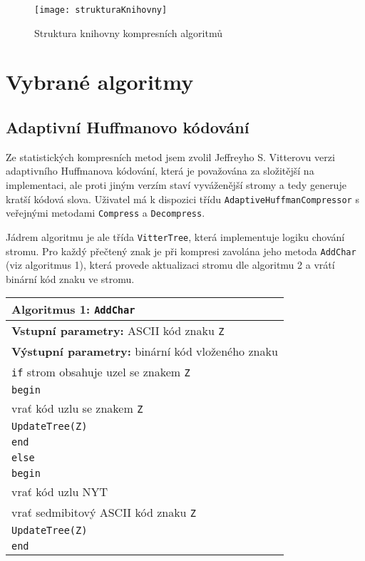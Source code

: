 \begin{figure}[!h]
\centering
\texttt{[image: strukturaKnihovny]}
\caption{Struktura knihovny kompresních algoritmů}
\label{strukturaKnihovny}
\end{figure}


\section{Vybrané algoritmy}
\subsection{Adaptivní Huffmanovo kódování}
Ze statistických kompresních metod jsem zvolil Jeffreyho S. Vitterovu verzi adaptivního Huffmanova kódování, která je považována za složitější na implementaci, ale proti jiným verzím staví vyváženější stromy a tedy generuje kratší kódová slova. Uživatel má k dispozici třídu \texttt{AdaptiveHuffmanCompressor} s veřejnými metodami \texttt{Compress} a \texttt{Decompress}. 

Jádrem algoritmu je ale třída \texttt{VitterTree}, která implementuje logiku chování stromu. Pro každý přečtený znak je při kompresi zavolána jeho metoda \texttt{AddChar} (viz algoritmus 1), která provede aktualizaci stromu dle algoritmu 2 a vrátí binární kód znaku ve stromu.

\begin{table}[!h]
\centering
\begin{tabular}{l}
\hline
\textbf{Algoritmus 1:} \texttt{AddChar}\\
\hline
\textbf{Vstupní parametry:} ASCII kód znaku \texttt{Z}\\
\textbf{Výstupní parametry:} binární kód vloženého znaku\\
\hline
\texttt{if} strom obsahuje uzel se znakem \texttt{Z}\\
\texttt{begin}\\
\hspace*{5mm}vrať kód uzlu se znakem \texttt{Z}\\
\hspace*{5mm}\texttt{UpdateTree(\texttt{Z})}\\
\texttt{end}\\
\texttt{else}\\
\texttt{begin}\\
\hspace*{5mm}vrať kód uzlu NYT\\
\hspace*{5mm}vrať sedmibitový ASCII kód znaku \texttt{Z}\\
\hspace*{5mm}\texttt{UpdateTree(\texttt{Z})}\\
\texttt{end}\\
\hline
\end{tabular}
\end{table}

